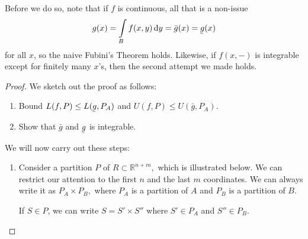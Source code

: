\documentclass{article}
\newcommand{\ubar}[1]{\underaccent{\bar}{#1}}
\begin{document}
Before we do so, note that if $f$ is continuous, all that is a non-issue
\begin{equation}
    g(x) = \int\limits_B f(x,y) \dd{y} = \bar{g}(x)=\ubar{g}(x)
\end{equation}
for all $x$, so the naive Fubini's Theorem holds. Likewise, if $f(x,-)$ is integrable except for finitely many $x$'s, then the second attempt we made holds.
\begin{proof}
    We sketch out the proof as follows:
    \begin{enumerate}
        \item Bound $L(f,P) \le L(\ubar{g},P_A)$ and $U(f,P) \le U(\bar{g}, P_A)$.
        \item Show that $\bar{g}$ and $\ubar{g}$ is integrable.
    \end{enumerate}
    We will now carry out these steps:
    \begin{enumerate}
        \item Consider a partition $P$ of $R \subset \mathbb{R}^{n+m},$ which is illustrated below. We can restrict our attention to the first $n$ and the last $m$ coordinates. We can always write it as $P_A \times P_B,$ where $P_A$ is a partition of $A$ and $P_B$ is a partition of $B$.
              \begin{center}
              \end{center}
              If $S\in P$, we can write $S = S'\times S''$ where $S' \in P_A$ and $S'' \in P_B$.


\end{enumerate}
\end{proof}
\end{document}
